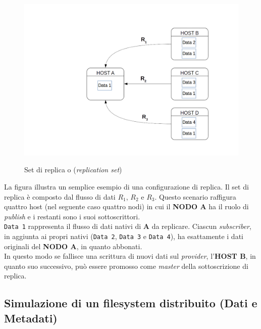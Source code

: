 \begin{figure}[htbp]
\centering
\includegraphics[scale=0.60]{img/setreplica.png}\\
\caption{Set di replica o (\textit{replication set}) \label{figura1.15}}
\end{figure}




La figura illustra un semplice esempio di una configurazione di replica. Il set di replica \`{e} composto dal flusso di dati $R_1$, $R_2$ e $R_3$.
Questo scenario raffigura quattro host (nel seguente caso quattro nodi) in cui il \textbf{NODO A} ha il ruolo di \textit{publish} e i restanti sono i suoi sottoscrittori.\\
\verb"Data 1" rappresenta il flusso di dati nativi di \textbf{A} da replicare. Ciascun \textit{subscriber}, in aggiunta ai propri nativi (\verb"Data 2", \verb"Data 3" e \verb"Data 4"), ha esattamente i dati originali del \textbf{NODO A}, in quanto abbonati. \\
In questo modo se fallisce una scrittura di nuovi dati sul \textit{provider}, l'\textbf{HOST B}, in quanto suo successivo, pu\`{o} essere promosso come \textit{master} della sottoscrizione di replica.

\subsection{Simulazione di un filesystem distribuito (Dati e Metadati)}

